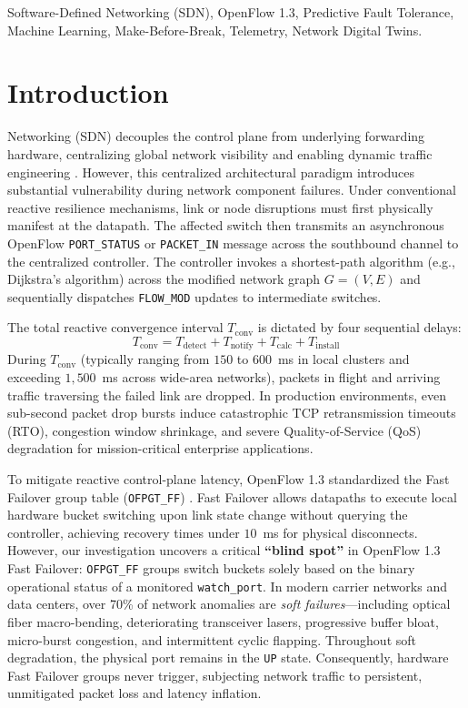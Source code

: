 \documentclass[journal,10pt,twocolumn]{IEEEtran}
\begin{document}
\begin{IEEEkeywords}
Software-Defined Networking (SDN), OpenFlow 1.3, Predictive Fault Tolerance, Machine Learning, Make-Before-Break, Telemetry, Network Digital Twins.
\end{IEEEkeywords}

\section{Introduction}
 Networking (SDN) decouples the control plane from underlying forwarding hardware, centralizing global network visibility and enabling dynamic traffic engineering \cite{mckeown2008openflow}. However, this centralized architectural paradigm introduces substantial vulnerability during network component failures. Under conventional reactive resilience mechanisms, link or node disruptions must first physically manifest at the datapath. The affected switch then transmits an asynchronous OpenFlow \texttt{PORT\_STATUS} or \texttt{PACKET\_IN} message across the southbound channel to the centralized controller. The controller invokes a shortest-path algorithm (e.g., Dijkstra's algorithm) across the modified network graph $G=(V, E)$ and sequentially dispatches \texttt{FLOW\_MOD} updates to intermediate switches.

The total reactive convergence interval $T_{\text{conv}}$ is dictated by four sequential delays:
\begin{equation}
T_{\text{conv}} = T_{\text{detect}} + T_{\text{notify}} + T_{\text{calc}} + T_{\text{install}}
\label{eq:t_conv}
\end{equation}
During $T_{\text{conv}}$ (typically ranging from $150$ to $600$~ms in local clusters and exceeding $1{,}500$~ms across wide-area networks), packets in flight and arriving traffic traversing the failed link are dropped. In production environments, even sub-second packet drop bursts induce catastrophic TCP retransmission timeouts (RTO), congestion window shrinkage, and severe Quality-of-Service (QoS) degradation for mission-critical enterprise applications.

To mitigate reactive control-plane latency, OpenFlow 1.3 standardized the Fast Failover group table (\texttt{OFPGT\_FF}) \cite{openflow13spec}. Fast Failover allows datapaths to execute local hardware bucket switching upon link state change without querying the controller, achieving recovery times under $10$~ms for physical disconnects. However, our investigation uncovers a critical \textbf{``blind spot''} in OpenFlow 1.3 Fast Failover: \texttt{OFPGT\_FF} groups switch buckets solely based on the binary operational status of a monitored \texttt{watch\_port}. In modern carrier networks and data centers, over 70\% of network anomalies are \textit{soft failures}---including optical fiber macro-bending, deteriorating transceiver lasers, progressive buffer bloat, micro-burst congestion, and intermittent cyclic flapping. Throughout soft degradation, the physical port remains in the \texttt{UP} state. Consequently, hardware Fast Failover groups never trigger, subjecting network traffic to persistent, unmitigated packet loss and latency inflation.
\end{document}
